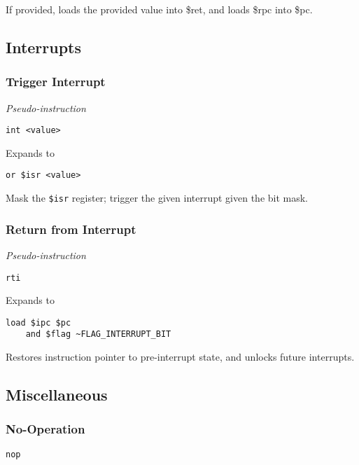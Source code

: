 If provided, loads the provided value into \$ret, and loads \$rpc into \$pc.

\subsection{Interrupts}

\subsubsection{Trigger Interrupt}

\textit{Pseudo-instruction}

\begin{lstlisting}[style=assembly]
    int <value>
\end{lstlisting}

Expands to

\begin{lstlisting}[style=assembly]
    or $isr <value>
\end{lstlisting}

Mask the \texttt{\$isr} register; trigger the given interrupt given the bit mask.

\subsubsection{Return from Interrupt}

\textit{Pseudo-instruction}

\begin{lstlisting}[style=assembly]
    rti
\end{lstlisting}

Expands to

\begin{lstlisting}[style=assembly]
    load $ipc $pc
    and $flag ~FLAG_INTERRUPT_BIT
\end{lstlisting}

Restores instruction pointer to pre-interrupt state, and unlocks future interrupts.

\subsection{Miscellaneous}

\subsubsection{No-Operation}

\begin{lstlisting}[style=assembly]
    nop
\end{lstlisting}

